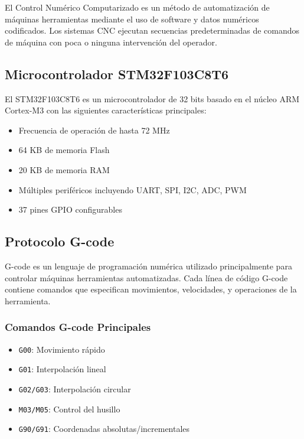 \documentclass[12pt]{article}
\begin{document}
El Control Numérico Computarizado es un método de automatización de máquinas herramientas mediante el uso de software y datos numéricos codificados. Los sistemas CNC ejecutan secuencias predeterminadas de comandos de máquina con poca o ninguna intervención del operador.

\subsection{Microcontrolador STM32F103C8T6}

El STM32F103C8T6 es un microcontrolador de 32 bits basado en el núcleo ARM Cortex-M3 con las siguientes características principales:

\begin{itemize}
    \item Frecuencia de operación de hasta 72 MHz
    \item 64 KB de memoria Flash
    \item 20 KB de memoria RAM
    \item Múltiples periféricos incluyendo UART, SPI, I2C, ADC, PWM
    \item 37 pines GPIO configurables
\end{itemize}

\subsection{Protocolo G-code}

G-code es un lenguaje de programación numérica utilizado principalmente para controlar máquinas herramientas automatizadas. Cada línea de código G-code contiene comandos que especifican movimientos, velocidades, y operaciones de la herramienta.

\subsubsection{Comandos G-code Principales}
\begin{itemize}
    \item \texttt{G00}: Movimiento rápido
    \item \texttt{G01}: Interpolación lineal
    \item \texttt{G02/G03}: Interpolación circular
    \item \texttt{M03/M05}: Control del husillo
    \item \texttt{G90/G91}: Coordenadas absolutas/incrementales
\end{itemize}
\end{document}
